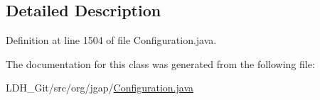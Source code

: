 \subsection{Detailed Description}


Definition at line 1504 of file Configuration.\-java.



The documentation for this class was generated from the following file\-:\begin{DoxyCompactItemize}
\item 
L\-D\-H\-\_\-\-Git/src/org/jgap/\hyperlink{_configuration_8java}{Configuration.\-java}\end{DoxyCompactItemize}
